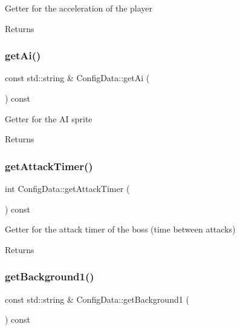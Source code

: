 Getter for the acceleration of the player \begin{DoxyReturn}{Returns}

\end{DoxyReturn}
\mbox{\label{classConfigData_a3c4ea1cdbbc1635fce4efec4b4aa1abd}} 
\subsubsection{\texorpdfstring{get\+Ai()}{getAi()}}
{\footnotesize\ttfamily const std\+::string \& Config\+Data\+::get\+Ai (\begin{DoxyParamCaption}{ }\end{DoxyParamCaption}) const}

Getter for the AI sprite \begin{DoxyReturn}{Returns}

\end{DoxyReturn}
\mbox{\label{classConfigData_ae73ba005cb7df3b2e9c38cb216324b05}} 
\subsubsection{\texorpdfstring{get\+Attack\+Timer()}{getAttackTimer()}}
{\footnotesize\ttfamily int Config\+Data\+::get\+Attack\+Timer (\begin{DoxyParamCaption}{ }\end{DoxyParamCaption}) const}

Getter for the attack timer of the boss (time between attacks) \begin{DoxyReturn}{Returns}

\end{DoxyReturn}
\mbox{\label{classConfigData_a14b80899285714c7d72330fef05d643d}} 
\subsubsection{\texorpdfstring{get\+Background1()}{getBackground1()}}
{\footnotesize\ttfamily const std\+::string \& Config\+Data\+::get\+Background1 (\begin{DoxyParamCaption}{ }\end{DoxyParamCaption}) const}

